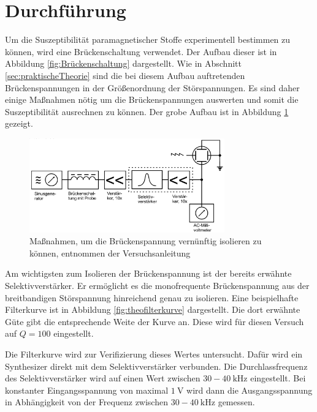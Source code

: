 \FloatBarrier
\section{Durchführung}
\label{sec:Durchführung}

Um die Suszeptibilität paramagnetischer Stoffe experimentell bestimmen zu können, wird eine Brückenschaltung verwendet.
Der Aufbau dieser ist in Abbildung \ref{fig:Brückenschaltung} dargestellt.
Wie in Abschnitt \ref{sec:praktischeTheorie} sind die bei diesem Aufbau auftretenden Brückenspannungen in der Größenordnung der Störspannungen.
Es sind daher einige Maßnahmen nötig um die Brückenspannungen auswerten und somit die Suszeptibilität ausrechnen zu können.
Der grobe Aufbau ist in Abbildung \ref{fig:Aufbau} gezeigt.

\begin{figure}
  \centering
  \includegraphics[width=0.75\textwidth]{images/Aufbau.png}
  \caption{Maßnahmen, um die Brückenspannung vernünftig isolieren zu können, entnommen der Versuchsanleitung\cite[183]{sample}}
  \label{fig:Aufbau}
\end{figure}

 Am wichtigsten zum Isolieren der Brückenspannung ist der bereits erwähnte Selektivverstärker.
 Er ermöglicht es die monofrequente Brückenspannung aus der breitbandigen Störspannung hinreichend genau zu isolieren.
 Eine beispielhafte Filterkurve ist in Abbildung \ref{fig:theofilterkurve} dargestellt.
 Die dort erwähnte Güte gibt die entsprechende Weite der Kurve an.
 Diese wird für diesen Versuch auf $Q = 100$ eingestellt.

 Die Filterkurve wird zur Verifizierung dieses Wertes untersucht.
 Dafür wird ein Synthesizer direkt mit dem Selektivverstärker verbunden.
 Die Durchlassfrequenz des Selektivverstärker wird auf einen Wert zwischen $30 - \SI{40}{\kilo\hertz}$ eingestellt.
 Bei konstanter Eingangsspannung von maximal $\SI{1}{\volt}$ wird dann die Ausgangsspannung in Abhängigkeit von der Frequenz zwischen $30 - \SI{40}{\kilo\hertz}$ gemessen.

